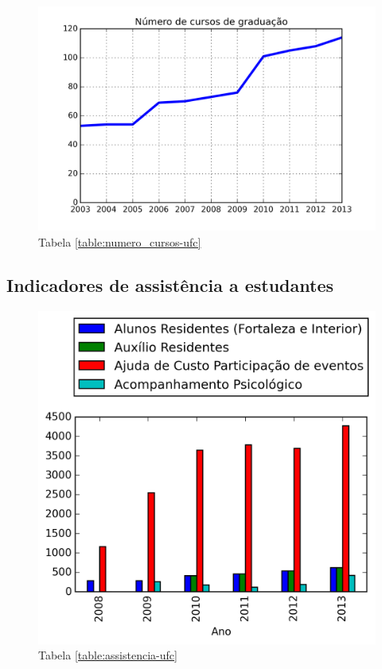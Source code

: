 \documentclass{report}
\begin{document}
\begin{figure}[H]
	\includegraphics{img/numero_cursos_ufc.png}
	\caption{Tabela \ref{table:numero_cursos-ufc}}
	\label{img:numero_cursos-ufc}
\end{figure}

\subsection{Indicadores de assistência a estudantes}

\begin{figure}[H]
	\includegraphics{img/assistencia_ufc.png}
	\caption{Tabela \ref{table:assistencia-ufc}}
	\label{img:assistencia-ufc}
\end{figure}
\end{document}
